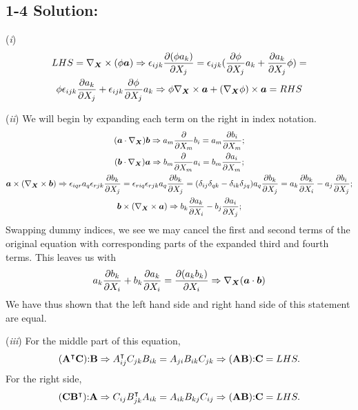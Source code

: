 \subsection*{\textbf{1-4 Solution:}}
(\textit{i}) \begin{gather*}
    LHS = \nabla_{\bm{X}} \times (\phi \bm{a}) \Rightarrow \epsilon_{ijk}\frac{\partial(\phi a_k)}{\partial X_j}=\epsilon_{ijk}(\frac{\partial\phi}{\partial X_j}a_k+\frac{\partial a_k}{\partial X_j}\phi)=\\
    \phi \epsilon_{ijk}\frac{\partial a_k}{\partial X_j}+\epsilon_{ijk}\frac{\partial\phi}{\partial X_j}a_k\Rightarrow \phi \nabla_{\bm{X}} \times \bm{a} + (\nabla_{\bm{X}}\phi) \times \bm{a} = RHS
\end{gather*}

(\textit{ii}) We will begin by expanding each term on the right in index notation.
\begin{gather*}
    (\bm{a} \cdot \nabla_{\bm{X}}) \bm{b}\Rightarrow a_m\frac{\partial}{\partial X_m}b_i=a_m\frac{\partial b_i}{\partial X_m};\\
    (\bm{b} \cdot \nabla_{\bm{X}}) \bm{a}\Rightarrow b_m\frac{\partial}{\partial X_m}a_i=b_m\frac{\partial a_i}{\partial X_m};\\
    \bm{a} \times (\nabla_{\bm{X}} \times \bm{b})\Rightarrow \epsilon_{iqr}a_q\epsilon_{rjk}\frac{\partial b_k}{\partial X_j}=\epsilon_{riq}\epsilon_{rjk}a_q\frac{\partial b_k}{\partial X_j}=(\delta_{ij}\delta_{qk}-\delta_{ik}\delta_{jq})a_q\frac{\partial b_k}{\partial X_j}=a_k \frac{\partial b_k}{\partial X_i}- a_j \frac{\partial b_i}{\partial X_j};\\
    \bm{b} \times (\nabla_{\bm{X}} \times \bm{a})\Rightarrow b_k \frac{\partial a_k}{\partial X_i}- b_j \frac{\partial a_i}{\partial X_j};
\end{gather*}
Swapping dummy indices, we see we may cancel the first and second terms of the original equation with corresponding parts of the expanded third and fourth terms. This leaves us with
\begin{gather*}
    a_k\frac{\partial b_k}{\partial X_i}+b_k\frac{\partial a_k}{\partial X_i}= \frac{\partial (a_k b_k)}{\partial X_i}\Rightarrow \nabla_{\bm{X}} (\bm{a}\cdot\bm{b})
\end{gather*}
We have thus shown that the left hand side and right hand side of this statement are equal.

(\textit{iii})
For the middle part of this equation,
\begin{gather*}
    (\mathbf{A}^\intercal \mathbf{C})\mathbf{:} \mathbf{B}\Rightarrow A^{\intercal}_{ij}C_{jk}B_{ik}=A_{ji}B_{ik}C_{jk}\Rightarrow (\mathbf{A} \mathbf{B}) \mathbf{:} \mathbf{C} = LHS.
\end{gather*}
For the right side,
\begin{gather*}
    (\mathbf{C} \mathbf{B}^\intercal)\mathbf{:} \mathbf{A}\Rightarrow C_{ij}B^\intercal_{jk}A_{ik}=A_{ik}B_{kj}C_{ij}\Rightarrow (\mathbf{A} \mathbf{B}) \mathbf{:} \mathbf{C} = LHS.
\end{gather*}

